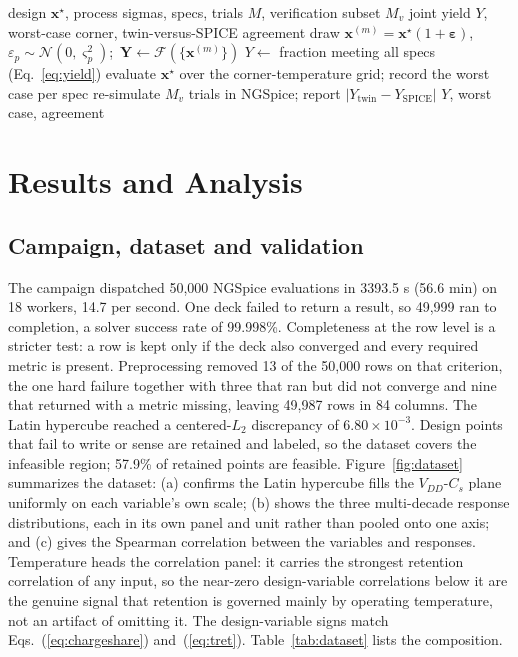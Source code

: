 \documentclass[11pt,a4paper]{article}
\newcommand{\Cs}{C_{s}}
\begin{document}
\begin{algorithm}[!ht]
\caption{Robustness and yield with SPICE verification}
\label{alg:robust}
\begin{algorithmic}[1]
\Require design $\mathbf{x}^{\star}$, process sigmas, specs, trials $M$,
verification subset $M_v$
\Ensure joint yield $Y$, worst-case corner, twin-versus-SPICE agreement
\State draw $\mathbf{x}^{(m)}=\mathbf{x}^{\star}(1+\boldsymbol\varepsilon)$,
$\varepsilon_p\sim\mathcal{N}(0,\varsigma_p^2)$;\ $\mathbf{Y}\gets
\mathcal{F}(\{\mathbf{x}^{(m)}\})$
\State $Y \gets$ fraction meeting all specs (Eq.~\ref{eq:yield})
\State evaluate $\mathbf{x}^{\star}$ over the corner-temperature grid; record the
worst case per spec
\State re-simulate $M_v$ trials in NGSpice; report
$|Y_{\mathrm{twin}}-Y_{\mathrm{SPICE}}|$
\State \Return $Y$, worst case, agreement
\end{algorithmic}
\end{algorithm}

\section{Results and Analysis}
\label{sec:results}

\subsection{Campaign, dataset and validation}

The campaign dispatched 50,000 NGSpice evaluations in 3393.5 s (56.6 min) on 18
workers, 14.7 per second. One deck failed to return a result, so 49,999 ran to
completion, a solver success rate of 99.998\%. Completeness at the row level is a
stricter test: a row is kept only if the deck also converged and every required
metric is present. Preprocessing removed 13 of the 50,000 rows on that criterion,
the one hard failure together with three that ran but did not converge and nine
that returned with a metric missing, leaving 49,987 rows in 84 columns. The Latin
hypercube reached a centered-$L_2$ discrepancy of $6.80\times10^{-3}$. Design points
that fail to write or sense are retained and labeled, so the dataset covers the
infeasible region; 57.9\% of retained points are feasible.
Figure~\ref{fig:dataset} summarizes the dataset: (a) confirms the Latin hypercube
fills the $V_{DD}$-$\Cs$ plane uniformly on each variable's own scale; (b) shows the
three multi-decade response distributions, each in its own panel and unit rather
than pooled onto one axis; and (c) gives the Spearman correlation between the
variables and responses. Temperature heads the correlation panel: it carries the
strongest retention correlation of any input, so the near-zero design-variable
correlations below it are the genuine signal that retention is governed mainly by
operating temperature, not an artifact of omitting it. The design-variable signs
match Eqs.~(\ref{eq:chargeshare}) and~(\ref{eq:tret}). Table~\ref{tab:dataset} lists
the composition.
\end{document}
